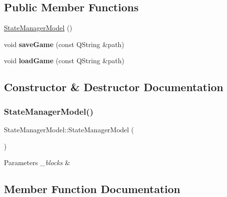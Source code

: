 \subsection*{Public Member Functions}
\begin{DoxyCompactItemize}
\item 
\mbox{\hyperlink{class_state_manager_model_a79fdf627c06b835bbe4c457366f66524}{State\+Manager\+Model}} ()
\item 
\mbox{\label{class_state_manager_model_a57883b92890873f23537e78c1bf6f2de}} 
void {\bfseries save\+Game} (const Q\+String \&path)
\item 
\mbox{\label{class_state_manager_model_abf3febd681c98f8522bd52944e720618}} 
void {\bfseries load\+Game} (const Q\+String \&path)
\end{DoxyCompactItemize}


\subsection{Constructor \& Destructor Documentation}
\mbox{\label{class_state_manager_model_a79fdf627c06b835bbe4c457366f66524}} 
\subsubsection{\texorpdfstring{StateManagerModel()}{StateManagerModel()}}
{\footnotesize\ttfamily State\+Manager\+Model\+::\+State\+Manager\+Model (\begin{DoxyParamCaption}{ }\end{DoxyParamCaption})}


\begin{DoxyParams}{Parameters}
{\em \+\_\+blocks} & \\
\hline
\end{DoxyParams}


\subsection{Member Function Documentation}
\mbox{\label{class_state_manager_model_a51df218169f899e063572ca5df5a388b}} 
